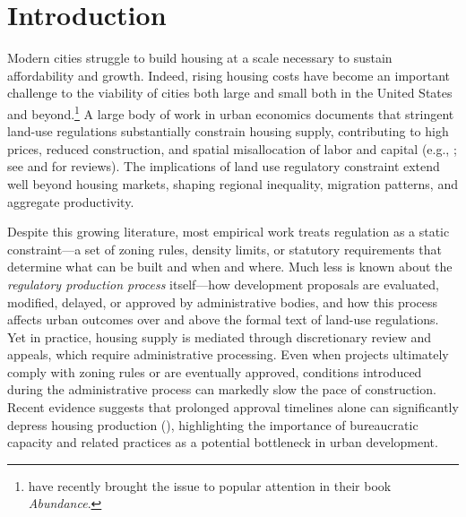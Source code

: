 \section{Introduction}\label{sec_intro}

Modern cities struggle to build housing at a scale necessary to sustain affordability and growth. Indeed, rising housing costs have become an important challenge to the viability of cities both large and small both in the United States and beyond.\footnote{\citet{klein2025abundance} have recently brought the issue to popular attention in their book \emph{Abundance}.} A large body of work in urban economics documents that stringent land-use regulations substantially constrain housing supply, contributing to high prices, reduced construction, and spatial misallocation of labor and capital (e.g., \citealp{glaeser2009, turner2014, hilber2016, ganongshoag2017, albouy2018, hsieh2019, brueckner2020, gabriel2020}; see \citealp{gyourkomolloy2015} and \citealp{molloy2020} for reviews). The implications of land use regulatory constraint extend well beyond housing markets, shaping regional inequality, migration patterns, and aggregate productivity.

Despite this growing literature, most empirical work treats regulation as a static constraint---a set of zoning rules, density limits, or statutory requirements that determine what can be built and when and where. Much less is known about the \textit{regulatory production process} itself---how development proposals are evaluated, modified, delayed, or approved by administrative bodies, and how this process affects urban outcomes over and above the formal text of land-use regulations. Yet in practice, housing supply is mediated through discretionary review and appeals, which require administrative processing. Even when projects ultimately comply with zoning rules or are eventually approved, conditions introduced during the administrative process can markedly slow the pace of construction. Recent evidence suggests that prolonged approval timelines alone can significantly depress housing production (\citealp{gabrielkung2025}), highlighting the importance of bureaucratic capacity and related practices as a potential bottleneck in urban development.

